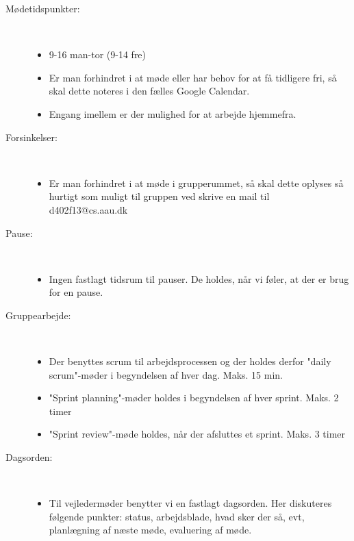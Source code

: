 \documentclass{memoir}
\begin{document}
\begin{description}
  \item[Mødetidspunkter:] \hfill \\
  \begin{itemize}
  \item 9-16 man-tor (9-14 fre)
  \item Er man forhindret i at møde eller har behov for at få tidligere fri, så skal dette noteres i den fælles Google Calendar.
  \item Engang imellem er der mulighed for at arbejde hjemmefra.
  \end{itemize}
  
  \item[Forsinkelser:] \hfill \\
  \begin{itemize}
  \item Er man forhindret i at møde i grupperummet, så skal dette oplyses så hurtigt som muligt til gruppen ved skrive en mail til d402f13@cs.aau.dk
  \end{itemize}
  
  \item[Pause:] \hfill \\
  \begin{itemize}
  \item Ingen fastlagt tidsrum til pauser. De holdes, når vi føler, at der er brug for en pause.
  \end{itemize}
  
  \item[Gruppearbejde:] \hfill \\
  \begin{itemize}
  \item Der benyttes scrum til arbejdsprocessen og der holdes derfor "daily scrum"-møder i begyndelsen af hver dag. Maks. 15 min.
  \item "Sprint planning"-møder holdes i begyndelsen af hver sprint. Maks. 2 timer
  \item "Sprint review"-møde holdes, når der afsluttes et sprint. Maks. 3 timer
  \end{itemize}
  
  \item[Dagsorden:] \hfill \\
  \begin{itemize}
  \item Til vejledermøder benytter vi en fastlagt dagsorden. Her diskuteres følgende punkter: status, arbejdsblade, hvad sker der så, evt, planlægning af næste møde, evaluering af møde.
  \end{itemize}
  

\end{description}
\end{document}
